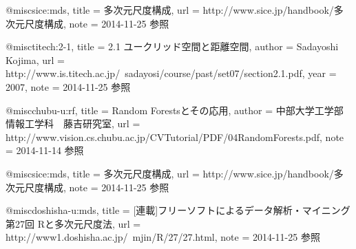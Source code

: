 @misc{sice:mds,
	title  = {多次元尺度構成},
	url    = {http://www.sice.jp/handbook/多次元尺度構成},
	note   = {2014-11-25 参照}
}

@misc{titech:2-1,
	title  = {2.1 ユークリッド空間と距離空間},
	author = {Sadayoshi Kojima},
	url    = {http://www.is.titech.ac.jp/~sadayosi/course/past/set07/section2.1.pdf},
	year   = {2007},
	note   = {2014-11-25 参照}
}

@misc{chubu-u:rf,
	title  = {Random Forestsとその応用},
	author = {中部大学工学部情報工学科　藤吉研究室},
	url    = {http://www.vision.cs.chubu.ac.jp/CVTutorial/PDF/04RandomForests.pdf},
	note   = {2014-11-14 参照}
}

@misc{sice:mds,
	title  = {多次元尺度構成},
	url    = {http://www.sice.jp/handbook/多次元尺度構成},
	note   = {2014-11-25 参照}
}

@misc{doshisha-u:mds,
	title  = {[連載]フリーソフトによるデータ解析・マイニング第27回 Rと多次元尺度法},
	url    = {http://www1.doshisha.ac.jp/~mjin/R/27/27.html},
	note   = {2014-11-25 参照}
}